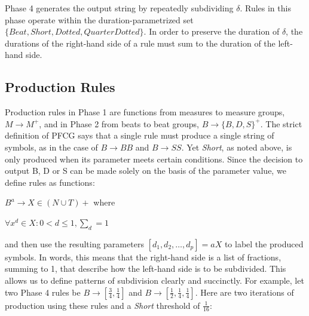 \documentclass{article}
\begin{document}
Phase 4 generates the output string by repeatedly subdividing $\delta$. Rules in this phase operate within the duration-parametrized set $\{Beat,\allowbreak Short,\allowbreak Dotted,\allowbreak QuarterDotted \}$. In order to preserve the duration of $\delta$, the durations of the right-hand side of a rule must sum to the duration of the left-hand side.









\subsection{Production Rules}

Production rules in Phase 1 are functions from measures to measure groups, $M \rightarrow M^{+}$, and in Phase 2 from beats to beat groups, $B \rightarrow \{B, D, S\}^{+}$. The strict definition of PFCG says that a single rule must produce a single string of symbols, as in the case of $B \rightarrow BB$ and $B \rightarrow SS$.  Yet \emph{Short}, as noted above, is only produced when its parameter meets certain conditions. Since the decision to output B, D or S can be made solely on the basis of the parameter value, we define rules as functions:

$B^a \rightarrow X \in (N \cup T)+$ where

$\forall x^{d} \in X: 0 < d \leq 1, \sum_{d} = 1$

and then use the resulting parameters $[d_1,d_2,\ldots,d_p]=aX$ to label the produced symbols. In words, this means that the right-hand side is a list of fractions, summing to 1, that describe how the left-hand side is to be subdivided. This allows us to define patterns of subdivision clearly and succinctly. For example, let two Phase 4 rules be $B \rightarrow [\frac{3}{4}, \frac{1}{4}]$ and $B \rightarrow [\frac{1}{2}, \frac{1}{4}, \frac{1}{4}]$. Here are two iterations of production using these rules and a \emph{Short} threshold of $\frac{1}{16}$:
\end{document}
